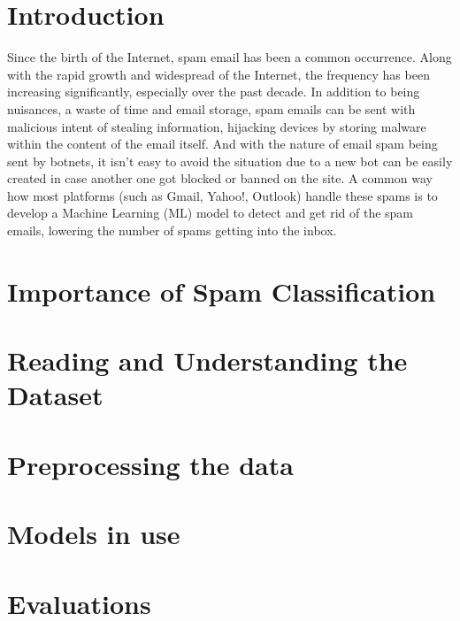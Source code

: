 \documentclass[conference]{IEEEtran}
\begin{document}
    \section{Introduction}
    \label{sec:introduction}
    Since the birth of the Internet, spam email has been a common occurrence.
    Along with the rapid growth and widespread of the Internet, the frequency has been increasing significantly, especially over the past decade.
    In addition to being nuisances, a waste of time and email storage, spam emails can be sent with malicious intent of stealing information, hijacking devices by storing malware within the content of the email itself.
    And with the nature of email spam being sent by botnets, it isn't easy to avoid the situation due to a new bot can be easily created in case another one got blocked or banned on the site.
    A common way how most platforms (such as Gmail, Yahoo!, Outlook) handle these spams is to develop a Machine Learning (ML) model to detect and get rid of the spam emails, lowering the number of spams getting into the inbox.


    \section{Importance of Spam Classification}
    \label{sec:importance-of-spam-classification}
    


    \section{Reading and Understanding the Dataset}
    \label{sec:reading-and-understanding-the-dataset}
    


    \section{Preprocessing the data}
    \label{sec:preprocessing-the-data}
    


    \section{Models in use}
    \label{sec:models-in-use}
    


    \section{Evaluations}
    \label{sec:evaluations}
    
\end{document}
